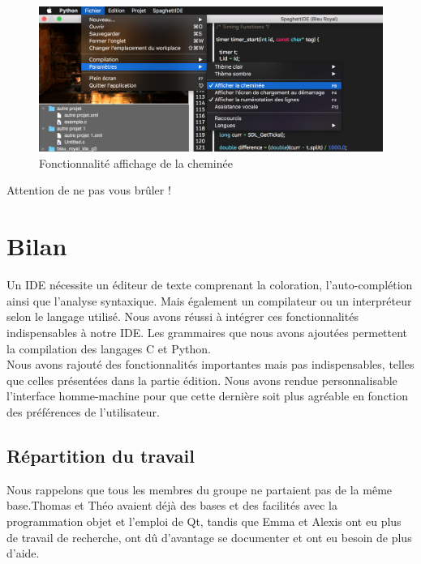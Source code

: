 \documentclass[a4paper,12pt]{article}
\begin{document}
	\begin{figure}[h!]
			\begin{center}
					\includegraphics[scale=0.2]{images/activ_cheminee}
					\caption{Fonctionnalité affichage de la cheminée}
			\end{center}
	\end{figure}
	
	Attention de ne pas vous brûler !

\section{Bilan}

Un IDE nécessite un éditeur de texte comprenant la coloration, l'auto-complétion ainsi que l'analyse syntaxique. Mais également un compilateur ou un interpréteur selon le langage utilisé. Nous avons réussi à intégrer ces fonctionnalités indispensables à notre IDE. Les grammaires que nous avons ajoutées permettent la compilation des langages C et Python.\\

Nous avons rajouté des fonctionnalités importantes mais pas indispensables, telles que celles présentées dans la partie édition. Nous avons rendue personnalisable l'interface homme-machine pour que cette dernière soit plus agréable en fonction des préférences de l'utilisateur.

\subsection{Répartition du travail}

	Nous rappelons que tous les membres du groupe ne partaient pas de la même base.Thomas et Théo avaient déjà des bases et des facilités avec la programmation objet et l'emploi de Qt, tandis que Emma et Alexis ont eu plus de travail de recherche, ont dû d'avantage se documenter et ont eu besoin de plus d'aide.
\end{document}

